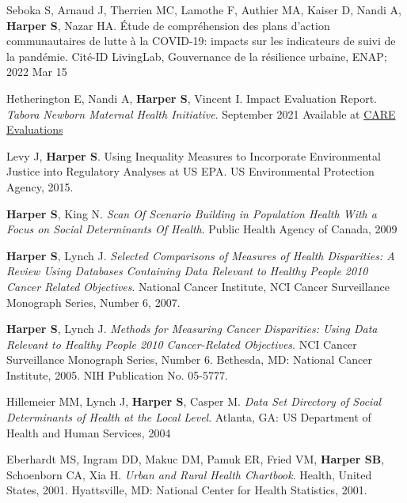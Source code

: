 \documentclass[
  letterpaper,
  DIV=11,
  numbers=noendperiod]{scrartcl}
\begin{document}
\begin{etaremune}

\item Seboka S, Arnaud J, Therrien MC, Lamothe F, Authier MA, Kaiser D, Nandi A, \textbf{Harper S}, Nazar HA. Étude de compréhension des plans d’action communautaires de lutte à la COVID-19: impacts sur les indicateurs de suivi de la pandémie. Cité-ID LivingLab, Gouvernance de la résilience urbaine, ENAP; 2022 Mar 15

\item Hetherington E, Nandi A, \textbf{Harper S}, Vincent I. Impact Evaluation Report. \emph{Tabora Newborn Maternal Health Initiative}. September 2021 Available at
\href{https://www.careevaluations.org/wp-content/uploads/TAMANI-impact-eval-report-FINAL.pdf}{CARE Evaluations}

\item   Levy J, \textbf{Harper S}. Using Inequality Measures to Incorporate Environmental Justice into Regulatory Analyses at US EPA. US Environmental Protection Agency, 2015.

\item \textbf{Harper S}, King N. \emph{Scan Of Scenario Building in Population Health With a Focus on Social Determinants Of Health}. Public Health Agency of Canada, 2009

\item \textbf{Harper S}, Lynch J.  \emph{Selected Comparisons of Measures of Health Disparities: A Review Using Databases Containing Data Relevant to Healthy People 2010 Cancer Related Objectives}.  National Cancer Institute, NCI Cancer Surveillance Monograph Series, Number 6, 2007.

\item \textbf{Harper S}, Lynch J. \emph{Methods for Measuring Cancer Disparities: Using Data Relevant to Healthy People 2010 Cancer-Related Objectives}. NCI Cancer Surveillance Monograph Series, Number 6. Bethesda, MD: National Cancer Institute, 2005. NIH Publication No. 05-5777.

\item Hillemeier MM, Lynch J, \textbf{Harper S}, Casper M.  \emph{Data Set Directory of Social Determinants of Health at the Local Level}.  Atlanta, GA: US Department of Health and Human Services, 2004 

\item Eberhardt MS, Ingram DD, Makuc DM, Pamuk ER, Fried VM, \textbf{Harper SB}, Schoenborn CA, Xia H. \emph{Urban and Rural Health Chartbook}.  Health, United States, 2001. Hyattsville, MD: National Center for Health Statistics, 2001.


\end{etaremune}
\end{document}
